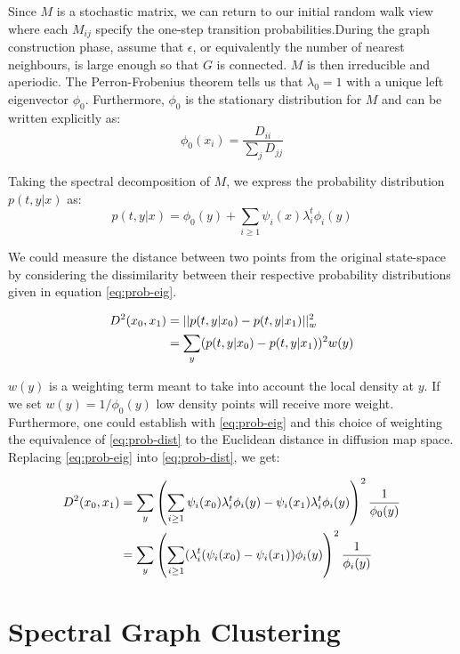 \documentclass[12pt, oneside, extrafontsizes]{memoir}  %
\theoremstyle{plain}
\theoremstyle{definition}
\begin{document}
Since $M$ is a stochastic matrix, we can return to our initial random walk view where each $M_{ij}$ specify the one-step transition probabilities.During the graph construction phase, assume that $\epsilon$, or equivalently the number of nearest neighbours, is large enough so that $G$ is connected. $M$ is then irreducible and aperiodic. The Perron-Frobenius theorem tells us that $\lambda_0 = 1$ with a unique left eigenvector $\phi_0$. Furthermore, $\phi_0$ is the stationary distribution for $M$ and can be written explicitly as:
\begin{equation}
\phi_0(x_i) = \frac{D_{ii}}{\sum_{j}D_{jj}}
\end{equation} 

Taking the spectral decomposition of $M$, we express the probability distribution $p(t, y|x)$ as:
\begin{equation}
\label{eq:prob-eig}
p(t, y|x) = \phi_0(y) + \sum_{i\geq 1} \psi_i(x) \lambda_i^t \phi_i(y) 
\end{equation} 

We could measure the distance between two points from the original state-space by considering the dissimilarity between their respective probability distributions given in equation \ref{eq:prob-eig}.

\begin{align}
\label{eq:prob-dist}
D^2(x_0, x_1) &= || p(t, y|x_0) - p(t, y|x_1) ||^2_w \\
&= \sum_{y} (p(t, y|x_0) - p(t, y|x_1))^2 w(y) \notag
\end{align}

$w(y)$ is a weighting term meant to take into account the local density at $y$. 
If we set $w(y) = 1/\phi_0(y)$ low density points will receive more weight. Furthermore, one could establish with \eqref{eq:prob-eig} and this choice of weighting the equivalence of  \eqref{eq:prob-dist} to the Euclidean distance in diffusion map space. Replacing \eqref{eq:prob-eig} into \eqref{eq:prob-dist}, we get:

\begin{align}
D^2(x_0, x_1) &= \sum_y \left(\sum_{i \geq 1} \psi_i(x_0) \lambda_i^t \phi_i(y) - \psi_i(x_1) \lambda_i^t \phi_i(y) \right)^2 \frac{1}{\phi_0(y)} \notag \\
&= \sum_y \left( \sum_{i \geq 1} (\lambda_i^t(\psi_i(x_0) - \psi_i(x_1))\phi_i(y) \right) ^2 \frac{1}{\phi_i(y)}
\end{align}

\section{Spectral Graph Clustering}
\end{document}
